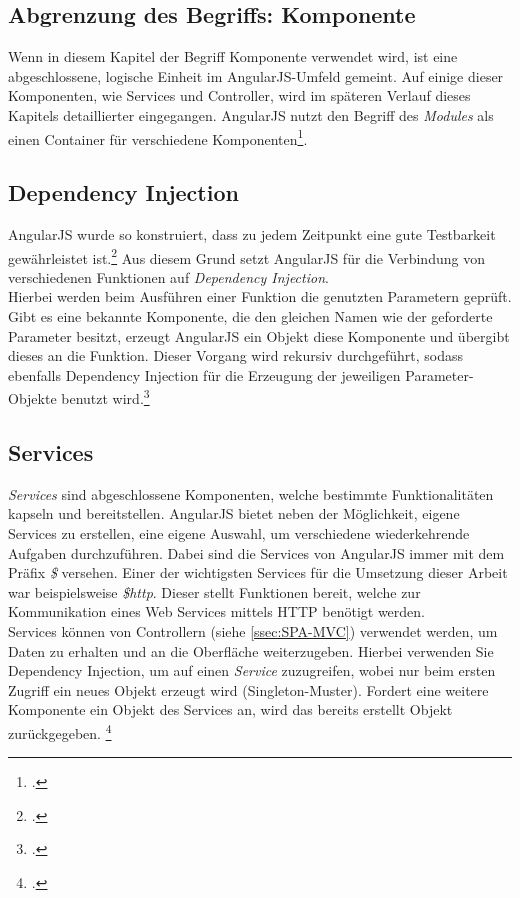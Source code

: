 \subsection{Abgrenzung des Begriffs: Komponente}
Wenn in diesem Kapitel der Begriff Komponente verwendet wird, ist eine abgeschlossene, logische Einheit im AngularJS-Umfeld gemeint. Auf einige dieser Komponenten, wie Services und Controller, wird im späteren Verlauf dieses Kapitels detaillierter eingegangen. AngularJS nutzt den Begriff des \textit{Modules} als einen Container für verschiedene Komponenten\footcite{online:angular:module}. 
\subsection{Dependency Injection}
\label{ssec:SPA-Dependency-Injection}
AngularJS wurde so konstruiert, dass zu jedem Zeitpunkt eine gute Testbarkeit gewährleistet ist.\footcite{online:angularjs:testability} Aus diesem Grund setzt AngularJS für die Verbindung von verschiedenen Funktionen auf \textit{Dependency Injection}. \\ 
Hierbei werden beim Ausführen einer Funktion die genutzten Parametern geprüft. Gibt es eine bekannte Komponente, die den gleichen Namen wie der geforderte Parameter besitzt, erzeugt AngularJS ein Objekt diese Komponente und übergibt dieses an die Funktion. Dieser Vorgang wird rekursiv durchgeführt, sodass ebenfalls Dependency Injection für die Erzeugung der jeweiligen Parameter-Objekte benutzt wird.\footcite{online:angularjs:dependency-injection}
\subsection{Services}
\label{ssec:SPA-Services}
\textit{Services} sind abgeschlossene Komponenten, welche bestimmte Funktionalitäten kapseln und bereitstellen. AngularJS bietet neben der Möglichkeit, eigene Services zu erstellen, eine eigene Auswahl, um verschiedene wiederkehrende Aufgaben durchzuführen. Dabei sind die Services von AngularJS immer mit dem Präfix \textit{\$} versehen. Einer der wichtigsten Services für die Umsetzung dieser Arbeit war beispielsweise \textit{\$http}. Dieser stellt Funktionen bereit, welche zur Kommunikation eines Web Services mittels \ac{HTTP} benötigt werden. \\
Services können von Controllern (siehe \ref{ssec:SPA-MVC}) verwendet werden, um Daten zu erhalten und an die Oberfläche weiterzugeben. Hierbei verwenden Sie Dependency Injection, um auf einen \textit{Service} zuzugreifen, wobei nur beim ersten Zugriff ein neues Objekt erzeugt wird (\gls{Singleton}-Muster). Fordert eine weitere Komponente ein Objekt des Services an, wird das bereits erstellt Objekt zurückgegeben. \footcite{online:angular:services}
